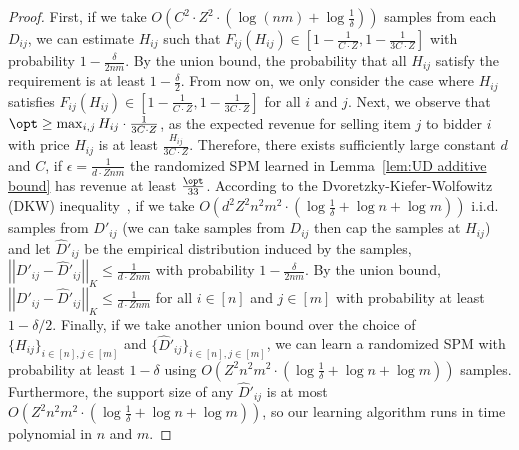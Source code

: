 \begin{proof}
	First, if we take $O\left(C^2\cdot Z^2\cdot \left(\log (nm)+\log \frac{1}{\delta}\right)\right)$ samples from each $D_{ij}$, we can estimate $H_{ij}$ such that $F_{ij}(H_{ij})\in[1-\frac{1}{C\cdot Z}, 1-\frac{1}{3C\cdot Z}]$ with probability $1-\frac{\delta}{2nm}$. By the union bound, the probability that all $H_{ij}$ satisfy the requirement is at least $1-\frac{\delta}{2}$. From now on, we only consider the case where $H_{ij}$ satisfies $F_{ij}(H_{ij})\in[1-\frac{1}{C\cdot Z}, 1-\frac{1}{3C\cdot Z}]$ for all $i$ and $j$. Next, we observe that $\opt \geq \max_{i,j} H_{ij}\cdot \frac{1}{3C\cdot Z}$, as the expected revenue for selling item $j$ to bidder $i$ with price $H_{ij}$ is at least $ \frac{H_{ij}}{3C\cdot Z}$. Therefore, there exists sufficiently large constant $d$ and $C$, if $\epsilon=\frac{1}{d\cdot Z nm}$ the randomized SPM learned in Lemma~\ref{lem:UD additive bound} has revenue at least $\frac{\opt}{33}$. According to the Dvoretzky-Kiefer-Wolfowitz (DKW) inequality~\cite{DvoretzkyKW56}, if we take $O\left(d^2 Z^2n^2m^2\cdot \left(\log \frac{1}{\delta}+\log n+\log m\right) \right)$ i.i.d. samples from $D'_{ij}$ (we can take samples from $D_{ij}$ then cap the samples at $H_{ij}$) and let $\hat{D}'_{ij}$ be the empirical distribution induced by the samples, $\left|\left|D'_{ij}-\hat{D}'_{ij}\right|\right|_K\leq \frac{1}{d\cdot Z nm}$ with probability $1-\frac{\delta}{2nm}$. By the union bound, $\left|\left|D'_{ij}-\hat{D}'_{ij}\right|\right|_K\leq \frac{1}{d\cdot Z nm}$ for all $i\in[n]$ and $j\in[m]$ with probability at least $1-\delta/2$. Finally, if we take another union bound over the choice of $\{H_{ij}\}_{i\in[n],j\in[m]}$ and $\{\hat{D}'_{ij}\}_{i\in[n],j\in[m]}$, we can learn a randomized SPM with probability at least $1-\delta$ using $O\left( Z^2n^2m^2\cdot \left(\log \frac{1}{\delta}+\log n+\log m\right) \right)$ samples. Furthermore, the support size of any $\hat{D}'_{ij}$ is at most $O\left( Z^2n^2m^2\cdot \left(\log \frac{1}{\delta}+\log n+\log m\right) \right)$, so our learning algorithm runs in time polynomial in $n$ and $m$.
	
	

\end{proof}
